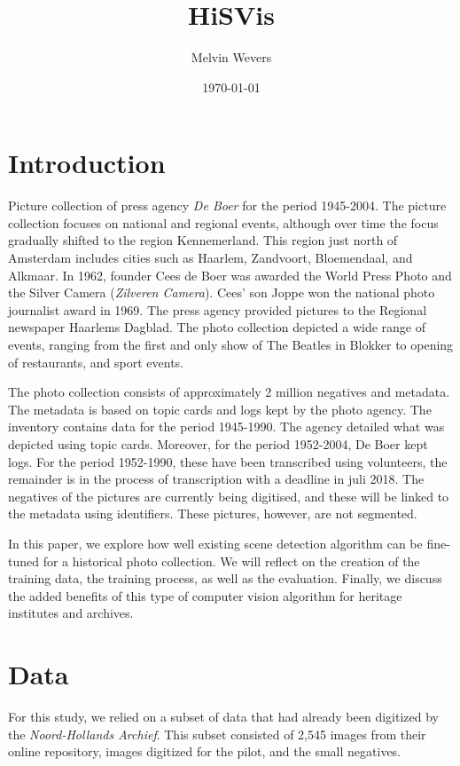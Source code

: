 \documentclass[12pt]{article}
\title{HiSVis}
\author{Melvin Wevers}
\date{\today}
\begin{document}
 
\maketitle
 
\section{Introduction}

Picture collection of press agency \textit{De Boer} for the period 1945-2004. The picture collection focuses on national and regional events, although over time the focus gradually shifted to the region Kennemerland. This region just north of Amsterdam includes cities such as Haarlem, Zandvoort, Bloemendaal, and Alkmaar.
%
In 1962, founder Cees de Boer was awarded the World Press Photo and the Silver Camera (\textit{Zilveren Camera}). Cees' son Joppe won the national photo journalist award in 1969. The press agency provided pictures to the Regional newspaper Haarlems Dagblad. The photo collection depicted a wide range of events, ranging from the first and only show of The Beatles in Blokker to opening of restaurants, and sport events.

The photo collection consists of approximately 2 million negatives and metadata. The metadata is based on topic cards and logs kept by the photo agency. The inventory contains data for the period 1945-1990. The agency detailed what was depicted using topic cards. Moreover, for the period 1952-2004, De Boer kept logs. For the period 1952-1990, these have been transcribed using volunteers, the remainder is in the process of transcription with a deadline in juli 2018.  The negatives of the pictures are currently being digitised, and these will be linked to the metadata using identifiers. These pictures, however, are not segmented.

In this paper, we explore how well existing scene detection algorithm can be fine-tuned for a historical photo collection. We will reflect on the creation of the training data, the training process, as well as the evaluation. Finally, we discuss the added benefits of this type of computer vision algorithm for heritage institutes and archives. 

\section{Data}

For this study, we relied on a subset of data that had already been digitized by the \textit{Noord-Hollands Archief}. This subset consisted of 2,545 images from their online repository, images digitized for the pilot, and the small negatives. 
\end{document}
